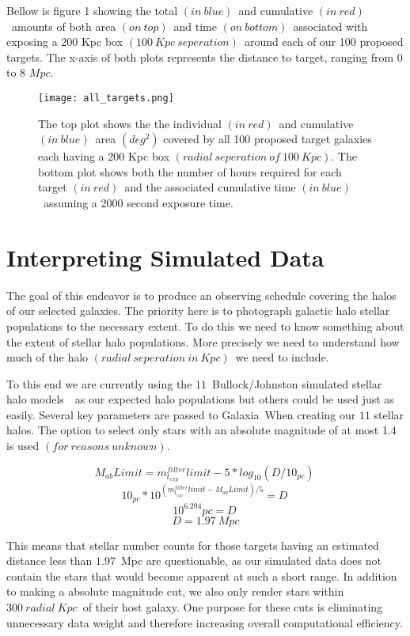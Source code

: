 \documentclass[11pt,a4paper,fleqn,notitlepage,oneside]{article}
\begin{document}
	Bellow is figure 1 showing the total $(in\ blue)$\ and cumulative $(in\ red)$\ amounts of both area $(on\ top)$\ and time $(on\ bottom)$\ associated with exposing a 200 Kpc box $(100\ Kpc\ seperation)$\ around each of our 100 proposed targets.
	The x-axis of both plots represents the distance to target, ranging from 0 to 8 $Mpc$.

	\begin{figure}[H]
		\texttt{[image: all\_targets.png]}
	\caption{
		The top plot shows the the individual $(in\ red)$\ and cumulative $(in\ blue)$\ area $(deg^{2})$ covered by all 100 proposed target galaxies each having a 200 Kpc box $(radial\ seperation\ of\ 100\ Kpc)$.
		The bottom plot shows both the number of hours required for each target $(in\ red)$\ and the associated cumulative time $(in\ blue)$\ assuming a 2000 second exposure time.
	}
	\label{fig:all_targets}
	\end{figure}

\section{Interpreting Simulated Data} %
	\label{sec:interpreting_simulated_data}
	The goal of this endeavor is to produce an observing schedule covering the halos of our selected galaxies.
	The priority here is to photograph galactic halo stellar populations to the necessary extent.
	To do this we need to know something about the extent of stellar halo populations.
	More precisely we need to understand how much of the halo $(radial\ seperation\ in\ Kpc)$\ we need to include.

	To this end we are currently using the $11$\ Bullock/Johnston simulated stellar halo models~\cite{2005ApJ...635..931B}\cite{2005ApJ...632..872R}\cite{2006ApJ...638..585F}\ as our expected halo populations but others could be used just as easily.
	Several key parameters are passed to Galaxia\cite{Sharma:2011:Online}\ When creating our $11$ stellar halos.
	The option to select only stars with an absolute magnitude of at most 1.4 is used $(for\ reasons\ unknown)$.
	
	\[
	M_{ab}Limit = m^{filter}_{t_{exp}}limit - 5 * log_{10}(D/10_{pc})\
	\]
	\[
	10_{pc}*10^{(m^{filter}_{t_{exp}}limit - M_{ab}Limit)/5} = D\
	\]
	\[
	10^{6.294}pc = D\
	\]
	\[
	D = 1.97\ Mpc
	\]

	This means that stellar number counts for those targets having an estimated distance less than $1.97$\ Mpc are questionable, as our simulated data does not contain the stars that would become apparent at such a short range.
	In addition to making a absolute magnitude cut, we also only render stars within $300\ radial\ Kpc$\ of their host galaxy.
	One purpose for these cuts is eliminating unnecessary data weight and therefore increasing overall computational efficiency.
\end{document}
